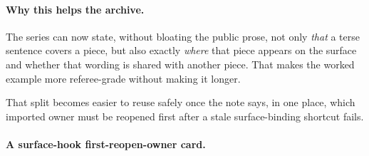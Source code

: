 \documentclass[11pt]{article}
\begin{document}
\paragraph{Why this helps the archive.}
The series can now state, without bloating the public prose, not only \emph{that} a terse sentence covers a piece, but also exactly \emph{where} that piece appears on the surface and whether that wording is shared with another piece.
That makes the worked example more referee-grade without making it longer.

\noindent That split becomes easier to reuse safely once the note says, in one place, which imported owner must be reopened first after a stale surface-binding shortcut fails.

\paragraph{A surface-hook first-reopen-owner card.}
\end{document}
